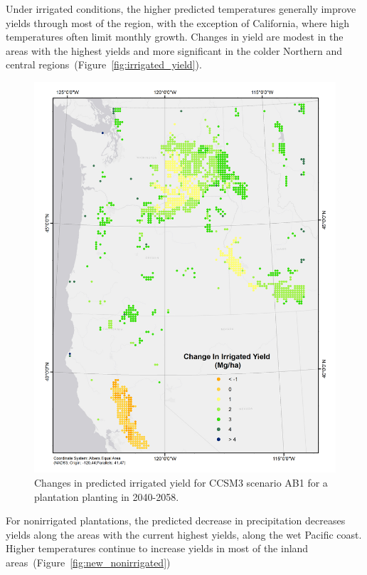 \documentclass[preprint,12pt]{elsarticle}
\begin{document}
Under irrigated conditions, the higher predicted temperatures
generally improve yields through most of the region, with the
exception of California, where high temperatures often limit monthly
growth.  Changes in yield are modest in the areas with the highest
yields and more significant in the colder Northern and central
regions~(Figure~\ref{fig:irrigated_yield}).
 
\begin{figure}[hp]
  \centering
  \includegraphics[width=1\linewidth]{climate_irrigated}
  \caption{Changes in predicted irrigated yield for \ac{CCSM3} scenario \ac{AB1}
    for a plantation planting in 2040-2058.}
  \label{fig:new_irrigated}
\end{figure}

For nonirrigated plantations, the predicted decrease in precipitation
decreases yields along the areas with the current highest yields,
along the wet Pacific coast.  Higher temperatures continue to increase
yields in most of the inland areas~(Figure~\ref{fig:new_nonirrigated})
\end{document}
